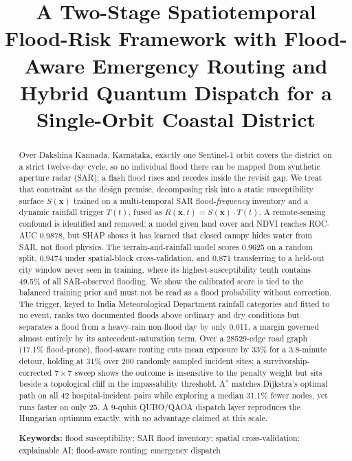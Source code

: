 \documentclass[11pt,a4paper]{article}
\title{\bfseries A Two-Stage Spatiotemporal Flood-Risk Framework with
Flood-Aware Emergency Routing and Hybrid Quantum Dispatch for a
Single-Orbit Coastal District}
\author{}
\date{}
\newcommand{\Sx}{S(\mathbf{x})}
\newcommand{\Tt}{T(t)}
\newcommand{\Rxt}{R(\mathbf{x},t)}
\begin{document}
\maketitle

\begin{abstract}
\noindent
Over Dakshina Kannada, Karnataka, exactly one Sentinel-1 orbit covers the
district on a strict twelve-day cycle, so no individual flood there can be mapped
from synthetic aperture radar (SAR): a flash flood rises and recedes inside the
revisit gap. We treat that constraint as the design premise, decomposing risk
into a static susceptibility surface $\Sx$ trained on a multi-temporal SAR
flood-\emph{frequency} inventory and a dynamic rainfall trigger $\Tt$, fused as
$\Rxt=\Sx\cdot\Tt$. A remote-sensing confound is identified and removed: a model
given land cover and NDVI reaches ROC-AUC 0.9878, but SHAP shows it has learned
that closed canopy hides water from SAR, not flood physics. The
terrain-and-rainfall model scores 0.9625 on a random split, 0.9474 under
spatial-block cross-validation, and 0.871 transferring to a held-out city window
never seen in training, where its highest-susceptibility tenth contains 49.5\% of
all SAR-observed flooding. We show the calibrated score is tied to the balanced
training prior and must not be read as a flood probability without correction.
The trigger, keyed to India Meteorological Department rainfall categories and
fitted to no event, ranks two documented floods above ordinary and dry conditions
but separates a flood from a heavy-rain non-flood day by only 0.011, a margin
governed almost entirely by its antecedent-saturation term. Over a
\num{28529}-edge road graph (17.1\% flood-prone), flood-aware routing cuts mean
exposure by 33\% for a 3.8-minute detour, holding at 31\% over 200 randomly
sampled incident sites; a survivorship-corrected $7\times7$ sweep shows the
outcome is insensitive to the penalty weight but sits beside a topological cliff
in the impassability threshold. A$^\ast$ matches Dijkstra's optimal path on all
42 hospital-incident pairs while exploring a median 31.1\% fewer nodes, yet runs
faster on only 25. A 9-qubit QUBO/QAOA dispatch layer reproduces the Hungarian
optimum exactly, with no advantage claimed at this scale.

\vspace{6pt}
\noindent\textbf{Keywords:} flood susceptibility; SAR flood inventory; spatial
cross-validation; explainable AI; flood-aware routing; emergency dispatch
\end{abstract}
\end{document}
